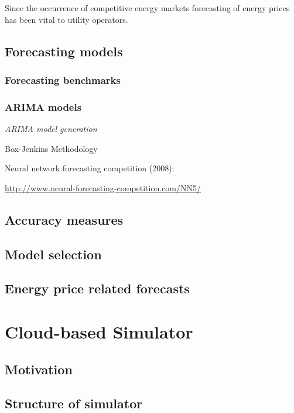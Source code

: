 Since the occurrence of competitive energy markets forecasting of energy prices has been vital to utility operators. 


\subsection{Forecasting models}


\subsubsection{Forecasting benchmarks}



\subsubsection{ARIMA models}

\emph{ARIMA model generation}

Box-Jenkins Methodology



Neural network forecasting competition (2008): 

\url{http://www.neural-forecasting-competition.com/NN5/}


\subsection{Accuracy measures}


\subsection{Model selection}


\subsection{Energy price related forecasts}



\section{Cloud-based Simulator}


\subsection{Motivation}

\subsection{Structure of simulator}

